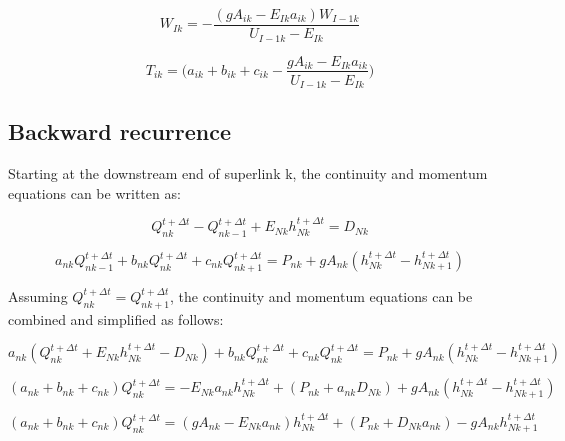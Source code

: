 \documentclass[11pt]{article}
\begin{document}
\begin{equation}
  \boxed{
    W_{Ik} = - \frac{(g A_{ik} - E_{Ik} a_{ik}) W_{I - 1k} }{U_{I - 1k} - E_{Ik}}
 }
\end{equation}

\begin{equation}
  \boxed{
 T_{ik} = \biggl(a_{ik} + b_{ik} + c_{ik} - \frac{ g A_{ik} - E_{Ik} a_{ik} }{U_{I-1k} - E_{Ik}} \biggr) 
 }
\end{equation}

\clearpage

\subsection{Backward recurrence}

Starting at the downstream end of superlink k, the continuity and momentum
equations can be written as:

\begin{equation}
  Q_{nk}^{t + \Delta t} - Q_{nk - 1}^{t + \Delta t} + E_{Nk} h_{Nk}^{t + \Delta t} = D_{Nk}
\end{equation}


\begin{equation}
   a_{nk} Q_{nk - 1}^{t + \Delta t} + b_{nk} Q_{nk}^{t + \Delta t} + c_{nk} Q_{nk + 1}^{t + \Delta t} = P_{nk} + g A_{nk} (h_{Nk}^{t + \Delta t} - h_{Nk+1}^{t + \Delta t})
\end{equation}

Assuming $Q_{nk}^{t + \Delta t} = Q_{nk+1}^{t + \Delta t}$, the continuity and
momentum equations can be combined and simplified as follows:

\begin{equation}
  a_{nk} (Q_{nk}^{t + \Delta t} + E_{Nk} h_{Nk}^{t + \Delta t} - D_{Nk}) + b_{nk} Q_{nk}^{t + \Delta t} + c_{nk} Q_{nk}^{t + \Delta t} = P_{nk} + g A_{nk} (h_{Nk}^{t + \Delta t} - h_{Nk + 1}^{t + \Delta t})
\end{equation}

\begin{equation}
  (a_{nk} + b_{nk} + c_{nk}) Q_{nk}^{t + \Delta t} = - E_{Nk} a_{nk} h_{Nk}^{t + \Delta t} + (P_{nk} + a_{nk} D_{Nk}) + g A_{nk} (h_{Nk}^{t + \Delta t} - h_{Nk + 1}^{t + \Delta t})
\end{equation}

\begin{equation}
  (a_{nk} + b_{nk} + c_{nk}) Q_{nk}^{t + \Delta t} = ( g A_{nk} - E_{Nk} a_{nk} ) h_{Nk}^{t + \Delta t} + (P_{nk} +  D_{Nk} a_{nk}) - g A_{nk} h_{Nk + 1}^{t + \Delta t}
\end{equation}
\end{document}
